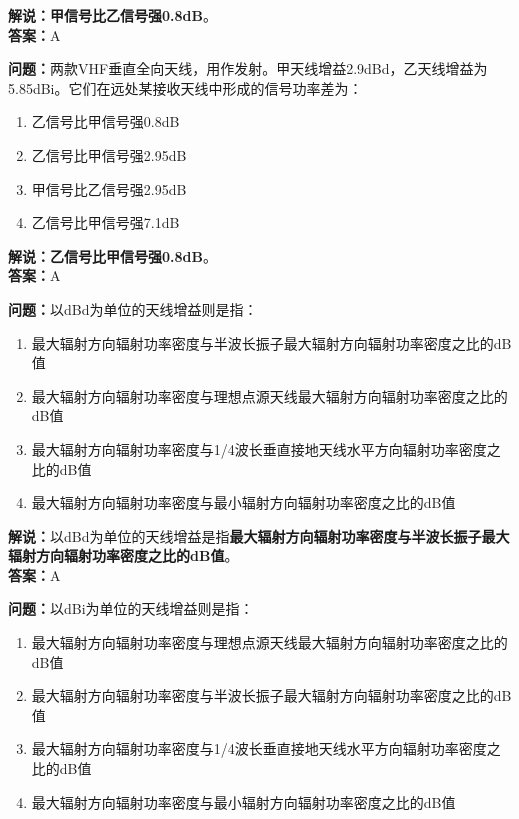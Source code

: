 \textbf{解说：甲信号比乙信号强0.8dB}。\\\textbf{答案：}A%



\textbf{问题：}两款VHF垂直全向天线，用作发射。甲天线增益2.9dBd，乙天线增益为5.85dBi。它们在远处某接收天线中形成的信号功率差为：

\begin{enumerate}[label=\Alph*), leftmargin=1cm]
	\item 乙信号比甲信号强0.8dB
	\item 乙信号比甲信号强2.95dB
	\item 甲信号比乙信号强2.95dB
	\item 乙信号比甲信号强7.1dB
\end{enumerate}

\textbf{解说：乙信号比甲信号强0.8dB}。\\\textbf{答案：}A



\textbf{问题：}以dBd为单位的天线增益则是指：

\begin{enumerate}[label=\Alph*), leftmargin=1cm]
	\item 最大辐射方向辐射功率密度与半波长振子最大辐射方向辐射功率密度之比的dB值
	\item 最大辐射方向辐射功率密度与理想点源天线最大辐射方向辐射功率密度之比的dB值
	\item 最大辐射方向辐射功率密度与1/4波长垂直接地天线水平方向辐射功率密度之比的dB值
	\item 最大辐射方向辐射功率密度与最小辐射方向辐射功率密度之比的dB值
\end{enumerate}

\textbf{解说：}以dBd为单位的天线增益是指\textbf{最大辐射方向辐射功率密度与半波长振子最大辐射方向辐射功率密度之比的dB值}。\\\textbf{答案：}A



\textbf{问题：}以dBi为单位的天线增益则是指：
\begin{enumerate}[label=\Alph*), leftmargin=1cm]
	\item 最大辐射方向辐射功率密度与理想点源天线最大辐射方向辐射功率密度之比的dB值
	\item 最大辐射方向辐射功率密度与半波长振子最大辐射方向辐射功率密度之比的dB值
	\item 最大辐射方向辐射功率密度与1/4波长垂直接地天线水平方向辐射功率密度之比的dB值
	\item 最大辐射方向辐射功率密度与最小辐射方向辐射功率密度之比的dB值
\end{enumerate}

